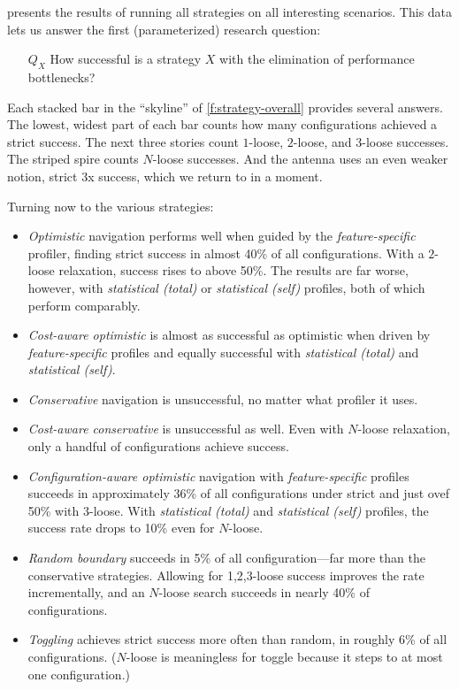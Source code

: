  presents the results of running all strategies on all
interesting scenarios.
This data lets us answer the first (parameterized) research question:

\begin{itemize}
  \item[$Q_X$] How successful is a strategy $X$ with the elimination of
    performance bottlenecks?
\end{itemize}

Each stacked bar in the ``skyline'' of \cref{f:strategy-overall} provides
several answers.
The lowest, widest part of each bar counts how many configurations
achieved a strict success.
The next three stories count $1$-loose, $2$-loose, and $3$-loose successes.
The striped spire counts $N$-loose successes.
And the antenna uses an even weaker notion, strict 3x success, which we return
to in a moment.

Turning now to the various strategies:
\begin{itemize}
  \item
    \emph{Optimistic} navigation performs well when guided by the \emph{feature-specific} profiler,
    finding strict success in almost 40\% of all configurations.
    With a $2$-loose relaxation, success rises to above 50\%.
    The results are far worse, however, with \emph{statistical (total)} or \emph{statistical (self)}
    profiles, both of which perform comparably.

  \item
    \emph{Cost-aware optimistic} is almost as successful as optimistic when driven
    by \emph{feature-specific} profiles and equally successful with \emph{statistical (total)}
    and \emph{statistical (self)}.

  \item
    \emph{Conservative} navigation is unsuccessful, no matter what profiler it uses.

  \item
    \emph{Cost-aware conservative} is unsuccessful as well.
    Even with $N$-loose relaxation, only a handful of configurations achieve success.

  \item
    \emph{Configuration-aware optimistic} navigation with
    \emph{feature-specific} profiles succeeds in approximately 36\% of all
    configurations under strict and just ovef 50\% with $3$-loose.
    With \emph{statistical (total)} and \emph{statistical (self)} profiles,
    the success rate drops to 10\% even for $N$-loose.

  \item
    \emph{Random boundary} succeeds in 5\% of all configuration---far more than the conservative strategies.
    Allowing for 1,2,3-loose success improves the rate incrementally, and an $N$-loose search
    succeeds in nearly 40\% of configurations.

  \item
    \emph{Toggling} achieves strict success more often than random, in roughly 6\% of all configurations.
    ($N$-loose is meaningless for toggle because it steps to at most one configuration.)
\end{itemize}

